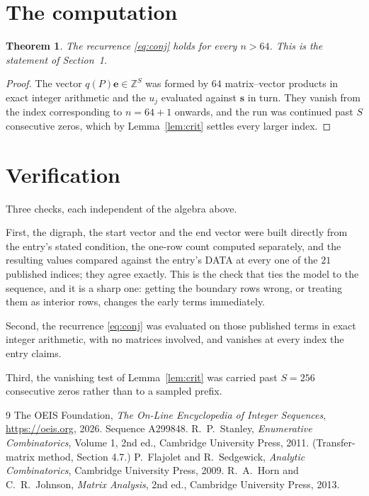 \documentclass[11pt,a4paper]{article}
\theoremstyle{plain}
\newtheorem{theorem}{Theorem}
\theoremstyle{definition}
\begin{document}
\section{The computation}

\begin{theorem}
The recurrence \eqref{eq:conj} holds for every $n>64$. This is the statement of
Section~1.
\end{theorem}

\begin{proof}
The vector $q(P)\mathbf{e}\in\mathbb{Z}^{S}$ was formed by $64$ matrix--vector
products in exact integer arithmetic and the $u_j$ evaluated against $\mathbf{s}$ in turn.
They vanish from the index corresponding to $n=64+1$ onwards, and the run was continued
past $S$ consecutive zeros, which by Lemma~\ref{lem:crit} settles every larger index.
\end{proof}

\section{Verification}

Three checks, each independent of the algebra above.

First, the digraph, the start vector and the end vector were built directly from the
entry's stated condition, the one-row count computed separately, and the resulting values
compared against the entry's DATA at every one of the $21$ published indices; they
agree exactly. This is the check that ties the model to the sequence, and it is a sharp one:
getting the boundary rows wrong, or treating them as interior rows, changes the early terms
immediately.

Second, the recurrence \eqref{eq:conj} was evaluated on those published terms in exact
integer arithmetic, with no matrices involved, and vanishes at every index the entry claims.

Third, the vanishing test of Lemma~\ref{lem:crit} was carried past $S=256$ consecutive
zeros rather than to a sampled prefix.

\begin{thebibliography}{9}
 The OEIS Foundation, \emph{The On-Line Encyclopedia of Integer
Sequences}, \url{https://oeis.org}, 2026. Sequence A299848.
 R.~P.~Stanley, \emph{Enumerative Combinatorics}, Volume 1, 2nd ed.,
Cambridge University Press, 2011. (Transfer-matrix method, Section 4.7.)
 P.~Flajolet and R.~Sedgewick, \emph{Analytic Combinatorics}, Cambridge
University Press, 2009.
 R.~A.~Horn and C.~R.~Johnson, \emph{Matrix Analysis}, 2nd ed., Cambridge
University Press, 2013.
\end{thebibliography}
\end{document}
